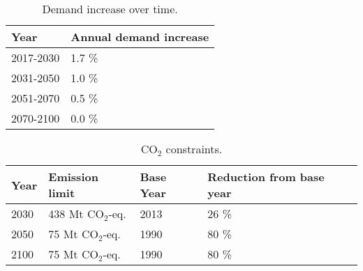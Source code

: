 \begin{table}[!ht]
	\caption{Demand increase over time.}
	\vspace{0.1in}
	\begin{tabularx}{\textwidth}{p{} p{}}
		\hline
\textbf{Year} & \textbf{Annual demand increase} \\
\hline
2017-2030 & 1.7 \% \\
2031-2050 & 1.0 \% \\
2051-2070 & 0.5 \% \\
2070-2100 & 0.0 \% \\
\hline 
	\end{tabularx}
\label{demand}
\end{table}

\begin{table}[!ht]
	\caption{CO$_2$ constraints.}
	\vspace{0.1in}
	\begin{tabularx}{\textwidth}{p{} p{}p{} p{}}
		\hline
\textbf{Year} & \textbf{Emission limit} & \textbf{Base Year} & \textbf{Reduction from base year} \\
\hline
2030 & 438 Mt CO$_2$-eq. & 2013 & 26 \% \\
2050 & 75 Mt CO$_2$-eq. & 1990 & 80 \% \\
2100 & 75 Mt CO$_2$-eq. & 1990 & 80 \% \\
\hline 
	\end{tabularx}
\label{co2-limits}
\end{table}

